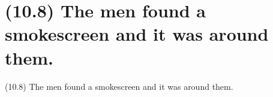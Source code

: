 \documentclass{article}
\begin{document}
\clearpage

%
%

\section*{(10.8) The men found a smokescreen and it was around them.}

\bigbreak
\begin{enumerate*}
\item[(10.8)] The men found a smokescreen and it was around them.
\end{enumerate*}
\bigbreak
\end{document}
